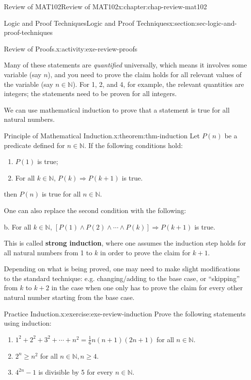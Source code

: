 \documentclass[oneside,10pt,]{book}
\newcommand{\terminology}[1]{\textbf{#1}}
\numberwithin{equation}{section}
\begin{document}
\begin{chapterptx}{Review of MAT102}{}{Review of MAT102}{}{}{x:chapter:chap-review-mat102}
\begin{sectionptx}{Logic and Proof Techniques}{}{Logic and Proof Techniques}{}{}{x:section:sec-logic-and-proof-techniques}
\begin{activity}{Review of Proofs.}{x:activity:exe-review-proofs}
%
\end{activity}%
Many of these statements are \emph{quantified} universally, which means it involves some variable (say \(n\)), and you need to prove the claim holds for all relevant values of the variable (say \(n \in \mathbb{N}\)). For 1, 2, and 4, for example, the relevant quantities are integers; the statements need to be proven for all integers.%
\par
We can use mathematical induction to prove that a statement is true for all natural numbers.%
\begin{theorem}{Principle of Mathematical Induction.}{}{x:theorem:thm-induction}%
Let \(P(n)\) be a predicate defined for \(n \in \mathbb{N}\). If the following conditions hold:%
\begin{enumerate}[label=(\alph*)]
\item{}\(P(1)\) is true;%
\item{}For all \(k \in \mathbb{N}\), \(P(k) \Rightarrow P(k+1)\) is true.%
\end{enumerate}
then \(P(n)\) is true for all \(n \in \mathbb{N}\).%
\par
One can also replace the second condition with the following:%
\par
b.\textasteriskcentered{} For all \(k \in \mathbb{N}\), \([P(1) \wedge P(2) \wedge \cdots \wedge P(k)] \Rightarrow P(k+1)\) is true.%
\par
This is called \terminology{strong induction}, where one assumes the induction step holds for all natural numbers from 1 to \(k\) in order to prove the claim for \(k+1\).%
\end{theorem}
Depending on what is being proved, one may need to make slight modifications to the standard technique: e.g. changing\slash{}adding to the base case, or ``skipping'' from \(k\) to \(k+2\) in the case when one only has to prove the claim for every other natural number starting from the base case.%
\begin{inlineexercise}{Practice Induction.}{x:exercise:exe-review-induction}%
Prove the following statements using induction:%
%
\begin{enumerate}[label=(\alph*)]
\item{}\(1^2 + 2^2 + 3^2 + \cdots + n^2 = \frac{1}{6}n(n+1)(2n+1)\) for all \(n \in \mathbb{N}\).%
\item{}\(2^n \geq n^2\) for all \(n \in \mathbb{N}, n \geq 4\).%
\item{}\(4^{2n} -1\) is divisible by 5 for every \(n \in \mathbb{N}\).%
\end{enumerate}

\end{inlineexercise}
\end{sectionptx}
\end{chapterptx}
\end{document}
